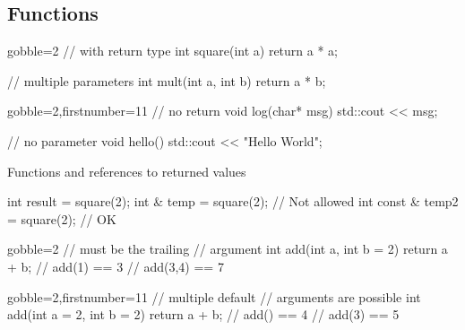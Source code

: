 \subsection[$f()$]{Functions}

\begin{frame}[fragile]
  \begin{multicols}{2}
    \begin{cppcode*}{gobble=2}
      // with return type
      int square(int a) {
        return a * a;
      }

      // multiple parameters
      int mult(int a,
               int b) {
        return a * b;
      }
    \end{cppcode*}
    \columnbreak
    \begin{cppcode*}{gobble=2,firstnumber=11}
      // no return
      void log(char* msg) {
        std::cout << msg;
      }

      // no parameter
      void hello() {
        std::cout << "Hello World";
      }
    \end{cppcode*}
  \end{multicols}

  \pause

  \begin{exampleblock}{Functions and references to returned values}
    \begin{cppcode}
      int result = square(2);
      int & temp = square(2);        // Not allowed
      int const & temp2 = square(2); // OK
    \end{cppcode}
  \end{exampleblock}
\end{frame}

\begin{frame}[fragile]
  \begin{multicols}{2}
    \begin{cppcode*}{gobble=2}
      // must be the trailing
      // argument
      int add(int a,
              int b = 2) {
        return a + b;
      }
      // add(1) == 3
      // add(3,4) == 7

    \end{cppcode*}
    \columnbreak
    \begin{cppcode*}{gobble=2,firstnumber=11}
      // multiple default
      // arguments are possible
      int add(int a = 2,
              int b = 2) {
        return a + b;
      }
      // add() == 4
      // add(3) == 5
    \end{cppcode*}
  \end{multicols}
\end{frame}


